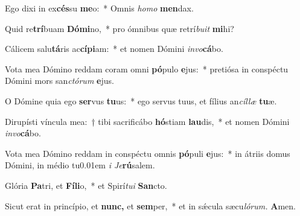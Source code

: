 \item Ego dixi in ex\textbf{cés}su \textbf{me}o:~* Omnis \textit{homo} \textbf{men}dax.
\item Quid re\textbf{trí}buam \textbf{Dó}\textbf{mi}no,~* pro ómnibus quæ retrí\textit{buit} \textbf{mi}hi?
\item Cálicem salu\textbf{tá}ris ac\textbf{cí}\textbf{pi}am:~* et nomen Dómini \textit{invo}\textbf{cá}bo.
\item Vota mea Dómino reddam coram omni \textbf{pó}pulo \textbf{e}jus:~* pretiósa in conspéctu Dómini mors san\textit{ctórum} \textbf{e}jus.
\item O Dómine quia ego \textbf{ser}vus \textbf{tu}us:~* ego servus tuus, et fílius an\textit{cíllæ} \textbf{tu}æ.
\item Dirupísti víncula mea:~† tibi sacrificábo \textbf{hó}stiam \textbf{lau}dis,~* et nomen Dómini \textit{invo}\textbf{cá}bo.
\item Vota mea Dómino reddam in conspéctu omnis \textbf{pó}puli \textbf{e}jus:~* in átriis domus Dómini, in médio tu\kern 0.01em \textit{i Je}\textbf{rú}salem.
\item Glória \textbf{Pa}tri, et \textbf{Fí}\textbf{li}o,~* et Spirí\tinyhspace\textit{tui} \textbf{San}cto.
\item Sicut erat in princípio, et \textbf{nunc,} et \textbf{sem}per,~* et in sǽcula sæcu\tinyhspace\textit{lórum.} \textbf{A}men.
